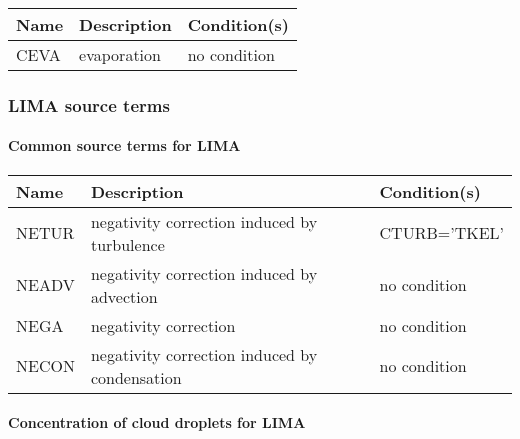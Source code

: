 \begin{longtable} {|p{}|p{}|p{}|}
\hline
Name & Description & Condition(s) \\
\hline \hline
CEVA   & evaporation & no condition \\\hline
\endhead
\end{longtable}

\subsubsection{LIMA source terms}

\paragraph{Common source terms for LIMA}
\mbox{} %

\begin{longtable} {|p{}|p{}|p{}|}
\hline
Name & Description & Condition(s) \\
\hline \hline
\endhead
NETUR  & negativity correction induced by turbulence   & CTURB='TKEL' \\\hline
NEADV  & negativity correction induced by advection    & no condition \\\hline
NEGA   & negativity correction                         & no condition \\\hline
NECON  & negativity correction induced by condensation & no condition \\\hline
\end{longtable}

\paragraph{Concentration of cloud droplets for LIMA}
\mbox{} %


